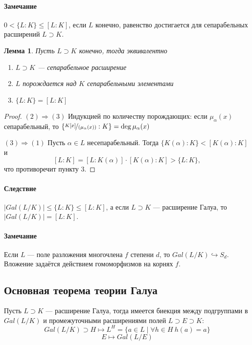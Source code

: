 \documentclass[a4paper]{article}
\numberwithin{theorem}{section}
\newtheorem{lemma}{Лемма}
\numberwithin{lemma}{section}
\numberwithin{proposition}{section}
\numberwithin{corollary}{section}
\begin{document}
\paragraph*{Замечание} $0 < \{L:K\} \le [L : K]$, если $L$ конечно,
равенство достигается для сепарабельных расширений $L \supset K$.

\begin{lemma}
Пусть $L \supset K$ конечно, тогда эквивалентно
\begin{enumerate}
    \item $L \supset K$ --- сепарабельное расширение
    \item $L$ порождается над $K$ сепарабельными элементами
    \item $\{L:K\} = [L : K]$
\end{enumerate}
\end{lemma}
\begin{proof} \indent

$(2) \Rightarrow (3)$ Индукцией по количеству порождающих:
если $\mu_\alpha(x)$ сепарабельный,
то $\{\nicefrac{K[x]}{(\mu_\alpha(x))} : K\} = \deg \mu_\alpha(x)$

$(3) \Rightarrow (1)$ Пусть $\alpha \in L$ несепарабельный.
Тогда $\{K(\alpha) : K\} < [K(\alpha) : K]$ и
\[[L : K] = [L : K(\alpha)] \cdot [K(\alpha) : K] > \{L : K\},\]
что противоречит пункту 3.
\end{proof}

\paragraph*{Следствие} $|Gal(L/K)| \le \{L : K\} \le [L : K]$,
а если $L \supset K$ --- расширение Галуа, то $|Gal(L/K)| = [L : K]$.

\paragraph*{Замечание}
Если $L$ --- поле разложения многочлена $f$ степени $d$,
то $Gal(L/K) \hookrightarrow S_d$. Вложение задаётся действием
гомоморфизмов на корнях $f$.

\subsection*{Основная теорема теории Галуа}

Пусть $L \supset K$ --- расширение Галуа, тогда имеется биекция между
подгруппами в $Gal(L/K)$ и промежуточными
расширениями полей $L \supset E \supset K$:
\[Gal(L/K) \supset H \mapsto L^H = \{a \in L \mid \forall h \in H \: h(a) = a\}\]
\[E \mapsto Gal(L/E)\]
\end{document}
